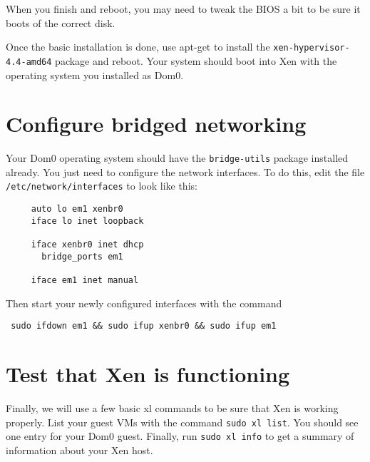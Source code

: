 \documentclass{article}
\begin{document}
 When you finish and reboot, you may need to tweak the BIOS a bit to be sure it boots of the correct disk.
 
 Once the basic installation is done, use apt-get to install the \texttt{xen-hypervisor-4.4-amd64} package and reboot. Your system should boot into Xen with the operating system you installed as Dom0.
 
 \section{Configure bridged networking}
 Your Dom0 operating system should have the \texttt{bridge-utils} package installed already. You just need to configure the network interfaces. 
 To do this, edit the file \texttt{/etc/network/interfaces} to look like this:
 
 \begin{verbatim}
     auto lo em1 xenbr0
     iface lo inet loopback

     iface xenbr0 inet dhcp
       bridge_ports em1

     iface em1 inet manual
\end{verbatim}

Then start your newly configured interfaces with the command

 \begin{verbatim}
 sudo ifdown em1 && sudo ifup xenbr0 && sudo ifup em1
 \end{verbatim}
 
 \section{Test that Xen is functioning}
 Finally, we will use a few basic xl commands to be sure that Xen is working properly. List your guest VMs with the command
 \texttt{sudo xl list}. You should see one entry for your Dom0 guest. Finally, run \texttt{sudo xl info} to get a summary of information 
 about your Xen host. 
 
 
\end{document}
